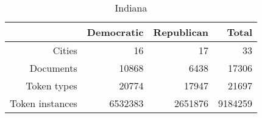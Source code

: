 \begin{table}[ht]
\centering
\begin{tabular}{rrrr}
  \hline
 & Democratic & Republican & Total \\ 
  \hline
Cities & 16 & 17 & 33 \\ 
  Documents & 10868 & 6438 & 17306 \\ 
  Token types & 20774 & 17947 & 21697 \\ 
  Token instances & 6532383 & 2651876 & 9184259 \\ 
   \hline
\end{tabular}
\caption{Indiana} 
\end{table}

